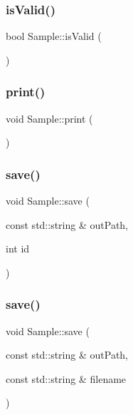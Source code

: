\mbox{\label{struct_sample_a8dbfc18d3b69992cb7865437242e1f55}} 
\subsubsection{\texorpdfstring{is\+Valid()}{isValid()}}
{\footnotesize\ttfamily bool Sample\+::is\+Valid (\begin{DoxyParamCaption}{ }\end{DoxyParamCaption})}

\mbox{\label{struct_sample_a9d1fe0b4de7a046026520b5efa39aac8}} 
\subsubsection{\texorpdfstring{print()}{print()}}
{\footnotesize\ttfamily void Sample\+::print (\begin{DoxyParamCaption}{ }\end{DoxyParamCaption})}

\mbox{\label{struct_sample_a2c873df91344017f41f144af9baa3b7c}} 
\subsubsection{\texorpdfstring{save()}{save()}\hspace{0.1cm}{\footnotesize\ttfamily [1/3]}}
{\footnotesize\ttfamily void Sample\+::save (\begin{DoxyParamCaption}\item[{const std\+::string \&}]{out\+Path,  }\item[{int}]{id }\end{DoxyParamCaption})}

\mbox{\label{struct_sample_a8e2faad4265f473f102594897a06ae1d}} 
\subsubsection{\texorpdfstring{save()}{save()}\hspace{0.1cm}{\footnotesize\ttfamily [2/3]}}
{\footnotesize\ttfamily void Sample\+::save (\begin{DoxyParamCaption}\item[{const std\+::string \&}]{out\+Path,  }\item[{const std\+::string \&}]{filename }\end{DoxyParamCaption})}

